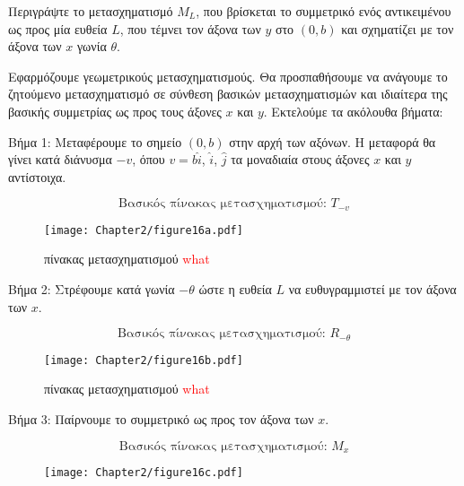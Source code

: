 
\begin{example}
Περιγράψτε το μετασχηματισμό $M_L$, που βρίσκεται το συμμετρικό ενός αντικειμένου ως προς μία ευθεία $L$, που τέμνει τον άξονα των $y$ στο $(0,b)$ και σχηματίζει με τον άξονα των $x$ γωνία $\theta$.
\end{example}
\begin{solution}



Εφαρμόζουμε γεωμετρικούς μετασχηματισμούς. Θα προσπαθήσουμε να ανάγουμε το ζητούμενο μετασχηματισμό σε σύνθεση βασικών μετασχηματισμών και ιδιαίτερα της βασικής συμμετρίας ως προς τους άξονες $x$ και $y$. Εκτελούμε τα ακόλουθα βήματα:


Βήμα 1:  Μεταφέρουμε το σημείο $(0, b)$ στην αρχή των αξόνων. Η μεταφορά θα γίνει κατά διάνυσμα $-v$, όπου $v = b\hat{i}$, $\hat{i}$, $\hat{j}$ τα μοναδιαία στους άξονες $x$ και $y$ αντίστοιχα.

\[
\text{Βασικός πίνακας μετασχηματισμού: } T_{-v}
\]

\begin{figure}[h!]
	\begin{center}

		    \texttt{[image: Chapter2/figure16a.pdf]}

	\end{center}
	\caption{πίνακας μετασχηματισμού \textcolor{red}{what}}
\end{figure}

Βήμα 2: Στρέφουμε κατά γωνία $-\theta$ ώστε η ευθεία $L$ να ευθυγραμμιστεί με τον άξονα των $x$.

\[
\text{Βασικός πίνακας μετασχηματισμού: } R_{-\theta}
\]

\begin{figure}[h!]
	\begin{center}

		    \texttt{[image: Chapter2/figure16b.pdf]}
	\end{center}
	\caption{πίνακας μετασχηματισμού \textcolor{red}{what}}
\end{figure}

Βήμα 3: Παίρνουμε το συμμετρικό ως προς τον άξονα των $x$.

\[
\text{Βασικός πίνακας μετασχηματισμού: } M_x
\]

\begin{figure}[h!]
	\begin{center}

		    \texttt{[image: Chapter2/figure16c.pdf]}


\end{center}
\end{figure}
\end{solution}
